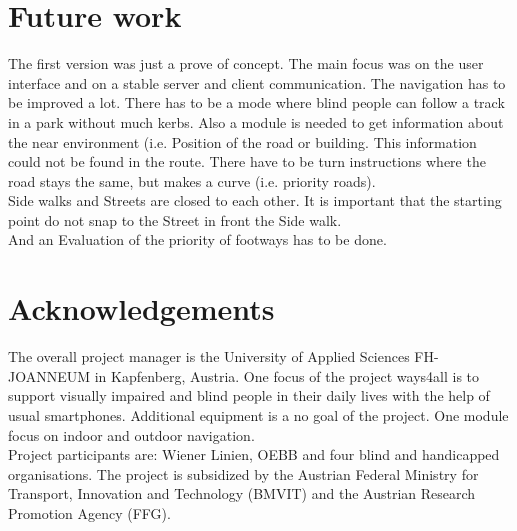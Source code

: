 \documentclass{sig-alternate}
\begin{document}
\section{Future work}
The first version was just a prove of concept. The main focus was on the user interface and on a stable server and client communication. The navigation has to be  improved a lot. There has to be a mode where blind people can follow a track in a park without much kerbs. Also a module is needed to get information about the near environment (i.e. Position of the road or building. This information could not be found in the route. There have to be turn instructions where the road stays the same, but makes a curve (i.e. priority roads). \\
Side walks and Streets are closed to each other. It is important that the starting point do not snap to the Street in front the Side walk. \\
And an Evaluation of the priority of footways has to be done. 


\section{Acknowledgements}
The overall project manager is the University of Applied Sciences FH-JOANNEUM in Kapfenberg, Austria. One focus of the project ways4all is to support visually impaired and blind people in their daily lives with the help of usual smartphones. Additional equipment is a no goal of the project. One module focus on indoor and outdoor navigation. \\
Project participants are: Wiener Linien, OEBB and four blind and handicapped organisations. The project is subsidized by the Austrian Federal Ministry
for Transport, Innovation and Technology (BMVIT) and the
Austrian Research Promotion Agency (FFG).

%

%
%
\end{document}
